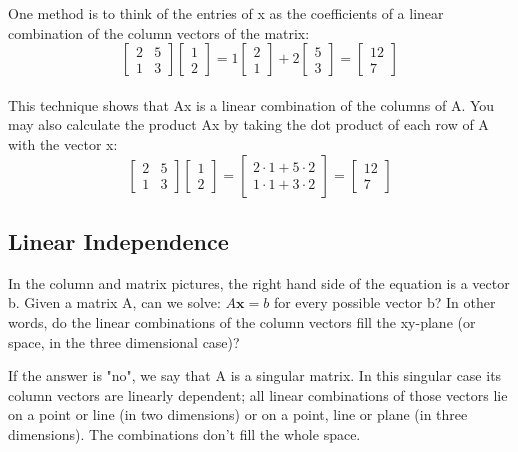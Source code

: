 \documentclass{ximera}
\begin{document}
\noindent
One method is to think of the entries of x as the coefficients of a linear
combination of the column vectors of the matrix:
\[\begin{bmatrix} 2 & 5\\ 1 & 3 \end{bmatrix} \begin{bmatrix} 1\\2 
\end{bmatrix} = 1\begin{bmatrix} 2\\1 \end{bmatrix} + 2 
\begin{bmatrix} 5\\3 \end{bmatrix} = \begin{bmatrix} 12\\7 \end{bmatrix}\]\\
This technique shows that Ax is a linear combination of the columns of A. 
You may also calculate the product Ax by taking the dot product of each 
row of A with the vector x:
\[\begin{bmatrix} 2 & 5\\ 1 & 3 \end{bmatrix} \begin{bmatrix} 1\\2 \end{bmatrix} 
= \begin{bmatrix} 2 \cdot 1 + 5 \cdot 2\\ 1 \cdot 1 + 3 \cdot 2 \end{bmatrix} = 
\begin{bmatrix} 12\\7 \end{bmatrix}\]

\subsection*{Linear Independence}

In the column and matrix pictures, the right hand side of the equation is a 
vector b. Given a matrix A, can we solve:
$A\mathbf{x} = b$
for every possible vector b? In other words, do the linear combinations of 
the column vectors fill the xy-plane (or space, in the three dimensional case)?

If the answer is "no", we say that A is a singular matrix. In this singular 
case its column vectors are linearly dependent; all linear combinations of 
those vectors lie on a point or line (in two dimensions) or on a point, line 
or plane (in three dimensions). The combinations don't fill the whole space.
\end{document}
